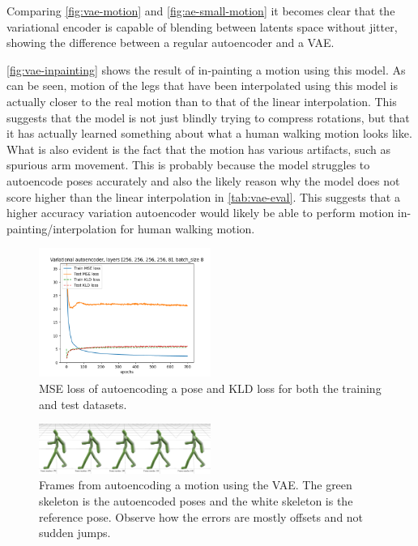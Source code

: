 Comparing \autoref{fig:vae-motion} and \autoref{fig:ae-small-motion} it becomes clear that the variational encoder is capable of blending between latents space without jitter, showing the difference between a regular autoencoder and a VAE.

\autoref{fig:vae-inpainting} shows the result of in-painting a motion using this model. As can be seen, motion of the legs that have been interpolated using this model is actually closer to the real motion than to that of the linear interpolation. This suggests that the model is not just blindly trying to compress rotations, but that it has actually learned something about what a human walking motion looks like. What is also evident is the fact that the motion has various artifacts, such as spurious arm movement. This is probably because the model struggles to autoencode poses accurately and also the likely reason why the model does not score higher than the linear interpolation in \autoref{tab:vae-eval}. This suggests that a higher accuracy variation autoencoder would likely be able to perform motion in-painting/interpolation for human walking motion.

\begin{figure}[h]
\centering
\includegraphics[width=0.5\textwidth]{img/vae_256-256-256-256-8_batch-8_losses}
\caption{MSE loss of autoencoding a pose and KLD loss for both the training and test datasets.}
\label{fig:vae-loss}
\end{figure}

\begin{figure}[h]
\centering
\includegraphics[width=0.5\textwidth]{img/vae-motion}
\caption{Frames from autoencoding a motion using the VAE. The green skeleton is the autoencoded poses and the white skeleton is the reference pose. Observe how the errors are mostly offsets and not sudden jumps.}
\label{fig:vae-motion}
\end{figure}

